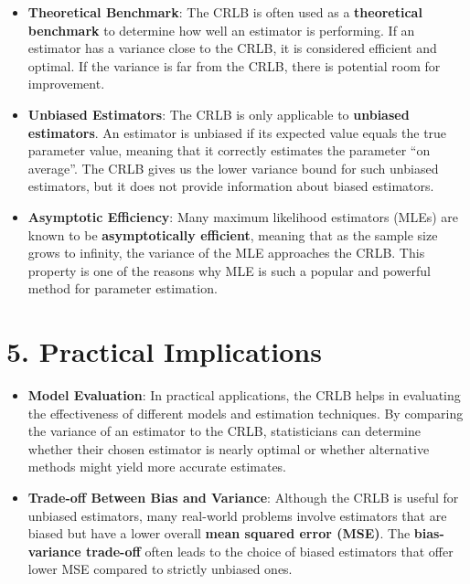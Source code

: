 \documentclass[
  12 pt,
  a4paper,
]{book}
\numberwithin{equation}{section}
\theoremstyle{plain}      %
\theoremstyle{definition} %
\theoremstyle{remark}     %
\theoremstyle{note}         %
\begin{document}
\begin{itemize}
\item
  \textbf{Theoretical Benchmark}: The CRLB is often used as a
  \textbf{theoretical benchmark} to determine how well an estimator is
  performing. If an estimator has a variance close to the CRLB, it is
  considered efficient and optimal. If the variance is far from the
  CRLB, there is potential room for improvement.
\item
  \textbf{Unbiased Estimators}: The CRLB is only applicable to
  \textbf{unbiased estimators}. An estimator is unbiased if its expected
  value equals the true parameter value, meaning that it correctly
  estimates the parameter ``on average''. The CRLB gives us the lower
  variance bound for such unbiased estimators, but it does not provide
  information about biased estimators.
\item
  \textbf{Asymptotic Efficiency}: Many maximum likelihood estimators
  (MLEs) are known to be \textbf{asymptotically efficient}, meaning that
  as the sample size grows to infinity, the variance of the MLE
  approaches the CRLB. This property is one of the reasons why MLE is
  such a popular and powerful method for parameter estimation.
\end{itemize}

\hypertarget{practical-implications}{%
\section{5. Practical Implications}\label{practical-implications}}

\begin{itemize}
\item
  \textbf{Model Evaluation}: In practical applications, the CRLB helps
  in evaluating the effectiveness of different models and estimation
  techniques. By comparing the variance of an estimator to the CRLB,
  statisticians can determine whether their chosen estimator is nearly
  optimal or whether alternative methods might yield more accurate
  estimates.
\item
  \textbf{Trade-off Between Bias and Variance}: Although the CRLB is
  useful for unbiased estimators, many real-world problems involve
  estimators that are biased but have a lower overall \textbf{mean
  squared error (MSE)}. The \textbf{bias-variance trade-off} often leads
  to the choice of biased estimators that offer lower MSE compared to
  strictly unbiased ones.
\end{itemize}
\end{document}
